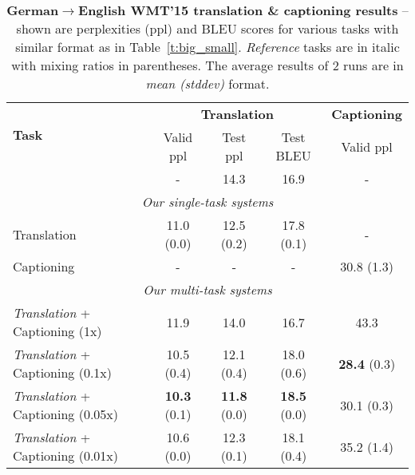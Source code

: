 \begin{table}[tbh!]
\centering
\begin{tabular}{l|c|c|c|c}
\multirow{ 2}{*}{\bf{Task}} & \multicolumn{3}{c|}{{\bf Translation}} &
\multicolumn{1}{c}{{\bf
Captioning}}\\
  \cline{2-5}
  & Valid ppl & Test ppl & Test BLEU & Valid ppl \\ %
  \hline
\citep{luong15attn} & - & 14.3 & 16.9 & - \\ %
  \hline
\multicolumn{5}{c}{{\it Our single-task systems}} \\
  \hline
Translation & 11.0 (0.0) & 12.5 (0.2) & 17.8 (0.1) & - \\ %
  \hline
Captioning & - & - & - & 30.8 (1.3) \\ %
  \hline
\multicolumn{5}{c}{{\it Our multi-task systems}} \\
  \hline
{\it Translation} + Captioning (1x) & 11.9 & 14.0 & 16.7 & 43.3 \\ %
{\it Translation} + Captioning (0.1x) &  10.5 (0.4) & 12.1 (0.4) & 18.0 (0.6) &
{\bf 28.4} (0.3) \\ %
{\it Translation} + Captioning (0.05x) &  {\bf 10.3} (0.1) &  {\bf 11.8} (0.0) &
{\bf 18.5} (0.0) & 30.1 (0.3) \\ %
{\it Translation} + Captioning (0.01x) &  10.6 (0.0) & 12.3 (0.1)& 18.1 (0.4) & 35.2 (1.4)
\\ %
\end{tabular}
\caption[Translation \& captioning results]{{\bf German$\rightarrow$English WMT'15 translation \& captioning results} -- shown are
perplexities (ppl) and BLEU scores 
for various tasks with similar format as
in Table~\ref{t:big_small}. {\it Reference} tasks are in italic with mixing
ratios in parentheses. The average results of 2 runs are in {\it
mean (stddev)} format.} %
\label{t:big_medium}
\end{table}


